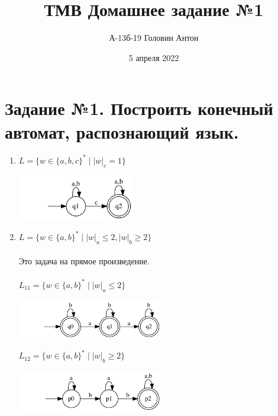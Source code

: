 \documentclass{article}
\title{ТМВ Домашнее задание №1}
\author{А-13б-19 Головин Антон}
\date{5 апреля 2022}
\begin{document}
\maketitle

\section{Задание №1. Построить конечный автомат, распознающий язык.}
\begin{enumerate}
\\
\item {$L = \{ w \in \{a,b,c\}^* \mid |w|_c = 1 \} $} \\
    \begin{center}
        \includegraphics[width=0.4\textwidth]{g11.png}
    \end{center}

\item {$L = \{ w \in \{a,b\}^*  \mid  |w|_a \le 2, {|w|_b} \ge 2 \}$} \\ \\
    Это задача на прямое произведение. \\ \\
    $L_{11} = \{ w \in \{a,b\}^*  \mid  |w|_a \le 2 \} $\\
    \begin{center}
        \includegraphics[width=0.5\textwidth]{g121.png}
    \end{center}

    $L_{12} = \{ w \in \{a,b\}^*  \mid  |w|_b \ge 2 \} $
    \begin{center}
        \includegraphics[width=0.5\textwidth]{g122.png}
    \end{center}
    

\end{enumerate}
\end{document}
